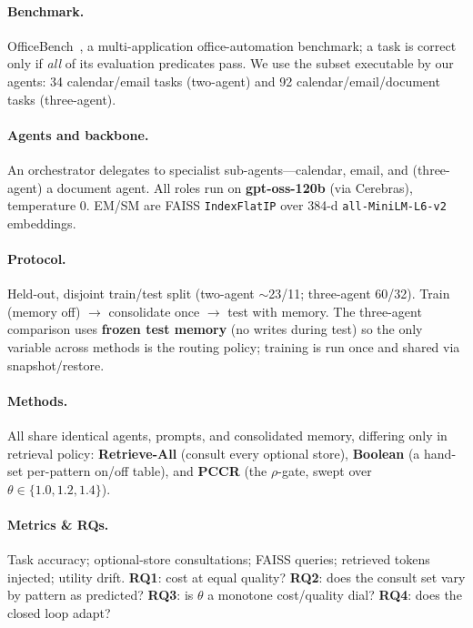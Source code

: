 \documentclass[10pt,twocolumn]{article}
\begin{document}
\paragraph{Benchmark.} OfficeBench~\cite{officebench}, a multi-application
office-automation benchmark; a task is correct only if \emph{all} of its
evaluation predicates pass. We use the subset executable by our agents: 34
calendar/email tasks (two-agent) and 92 calendar/email/document tasks
(three-agent).

\paragraph{Agents and backbone.} An orchestrator delegates to specialist
sub-agents---calendar, email, and (three-agent) a document agent. All roles run
on \textbf{gpt-oss-120b} (via Cerebras), temperature 0. EM/SM are FAISS
\texttt{IndexFlatIP} over 384-d \texttt{all-MiniLM-L6-v2} embeddings.

\paragraph{Protocol.} Held-out, disjoint train/test split (two-agent
$\sim$23/11; three-agent 60/32). Train (memory off) $\rightarrow$ consolidate
once $\rightarrow$ test with memory. The three-agent comparison uses
\textbf{frozen test memory} (no writes during test) so the only variable across
methods is the routing policy; training is run once and shared via
snapshot/restore.

\paragraph{Methods.} All share identical agents, prompts, and consolidated
memory, differing only in retrieval policy: \textbf{Retrieve-All} (consult every
optional store), \textbf{Boolean} (a hand-set per-pattern on/off table), and
\textbf{PCCR} (the $\rho$-gate, swept over $\theta\in\{1.0,1.2,1.4\}$).

\paragraph{Metrics \& RQs.} Task accuracy; optional-store consultations; FAISS
queries; retrieved tokens injected; utility drift. \textbf{RQ1}: cost at equal
quality? \textbf{RQ2}: does the consult set vary by pattern as predicted?
\textbf{RQ3}: is $\theta$ a monotone cost/quality dial? \textbf{RQ4}: does the
closed loop adapt?
\end{document}
